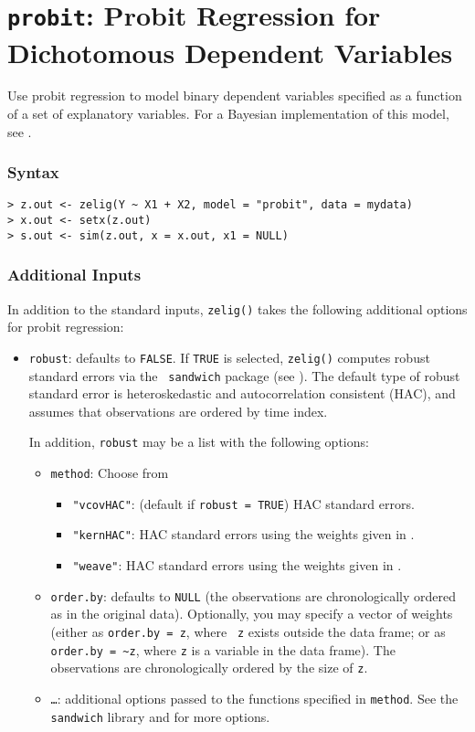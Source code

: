 \documentclass{article}
\begin{document}
\nobibliography*



\section{{\tt probit}: Probit Regression for Dichotomous Dependent Variables}\label{probit}

Use probit regression to model binary dependent variables
specified as a function of a set of explanatory variables.  For a
Bayesian implementation of this model, see .  

\subsubsection{Syntax}
\begin{verbatim}
> z.out <- zelig(Y ~ X1 + X2, model = "probit", data = mydata)
> x.out <- setx(z.out)
> s.out <- sim(z.out, x = x.out, x1 = NULL)
\end{verbatim}

\subsubsection{Additional Inputs} 

In addition to the standard inputs, {\tt zelig()} takes the following
additional options for probit regression:  
\begin{itemize}
\item {\tt robust}: defaults to {\tt FALSE}.  If {\tt TRUE} is
selected, {\tt zelig()} computes robust standard errors via the {\tt
sandwich} package (see \cite{Zeileis04}).  The default type of robust
standard error is heteroskedastic and autocorrelation consistent (HAC),
and assumes that observations are ordered by time index.

In addition, {\tt robust} may be a list with the following options:  
\begin{itemize}
\item {\tt method}:  Choose from 
\begin{itemize}
\item {\tt "vcovHAC"}: (default if {\tt robust = TRUE}) HAC standard
errors. 
\item {\tt "kernHAC"}: HAC standard errors using the
weights given in \cite{Andrews91}. 
\item {\tt "weave"}: HAC standard errors using the
weights given in \cite{LumHea99}.  
\end{itemize}  
\item {\tt order.by}: defaults to {\tt NULL} (the observations are
chronologically ordered as in the original data).  Optionally, you may
specify a vector of weights (either as {\tt order.by = z}, where {\tt
z} exists outside the data frame; or as {\tt order.by = \~{}z}, where
{\tt z} is a variable in the data frame).  The observations are
chronologically ordered by the size of {\tt z}.
\item {\tt \dots}:  additional options passed to the functions 
specified in {\tt method}.   See the {\tt sandwich} library and
\cite{Zeileis04} for more options.   
\end{itemize}
\end{itemize}
\end{document}
